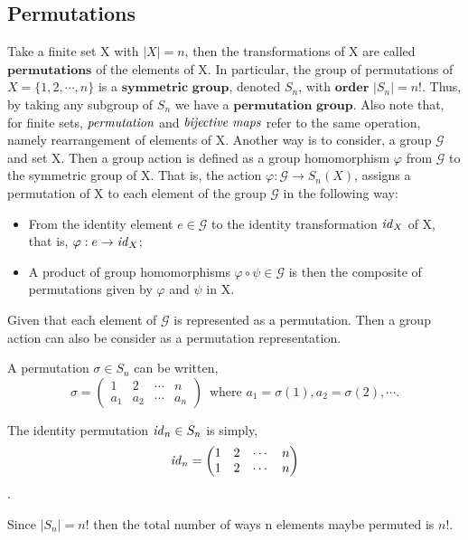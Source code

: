 

\subsection{Permutations} %
\label{sec:permutations}
Take a finite set X with $|X|=n$, then the transformations of X are called $\textbf{permutations}$ of the
elements of X. In particular, the group of permutations of $X=\{ 1, 2, \cdots, n \}$ is a $\textbf{symmetric group}$,
denoted $S_n$, with $\textbf{order}$ $|S_n|=n!$. Thus, by taking any subgroup of $S_n$ we have a
$\textbf{permutation group}$. Also note that, for finite sets, $\emph{permutation}$ and $\emph{bijective maps}$
refer to the same operation, namely rearrangement of elements of X.
Another way is to consider, a group $\mathcal{G}$ and set X.
Then a group action is defined as a group homomorphism $\varphi$ from $\mathcal{G}$ to the symmetric group of X.
That is, the action $\varphi: \mathcal{G} \to S_n(X)$, assigns a permutation of X to each element of the group $\mathcal{G}$ in the following way:
\begin{itemize}
 \item From the identity element $e \in \mathcal{G}$ to the identity transformation $\mathit{id}_{X}$ of X, that is, $\varphi : e \to \mathit{id}_{X}$;
 \item A product of group homomorphisms $\varphi \circ \psi \in \mathcal{G}$ is then the composite of permutations given by $\varphi$ and $\psi$ in X.
\end{itemize}
Given that each element of $\mathcal{G}$ is represented as a permutation. Then a group action can also be consider as a permutation representation.

A permutation $\sigma \in S_n$ can be written,
\[
 \sigma =
 \begin{pmatrix}
  1 & 2 & \cdots & n \\
  a_1 & a_2 & \cdots & a_n
 \end{pmatrix}
 \, \, \,
 \text{where } a_1 = \sigma(1), a_2 = \sigma(2), \cdots .
\]

The identity permutation $\mathit{id}_{n} \in S_n$ is simply,
\[
 \mathit{id}_{n} =
 \begin{pmatrix}
  1 & 2 & \cdots & n \\
  1 & 2 & \cdots & n
 \end{pmatrix}
\].

Since $|S_n|=n!$ then the total number of ways n elements maybe permuted is $n!$.

